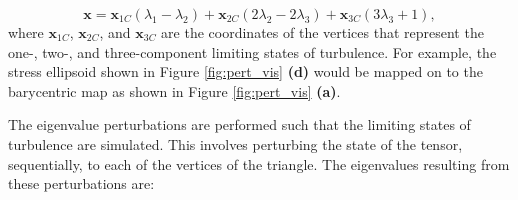 \begin{equation}\label{equ:barycentric_mapping}
    \textbf{x} = \textbf{x}_{1C} (\lambda_1 - \lambda_2) + \textbf{x}_{2C} (2\lambda_2 - 2\lambda_3) + \textbf{x}_{3C} (3\lambda_3 + 1), 
\end{equation}
where $\textbf{x}_{1C}$, $\textbf{x}_{2C}$, and $\textbf{x}_{3C}$ are the coordinates of the vertices that represent the one-, two-, and three-component limiting states of turbulence. For example, the stress ellipsoid shown in Figure \ref{fig:pert_vis} \textbf{(d)} would be mapped on to the barycentric map as shown in Figure \ref{fig:pert_vis} \textbf{(a)}.

The eigenvalue perturbations are performed such that the limiting states of turbulence are simulated. This involves perturbing the state of the tensor, sequentially, to each of the vertices of the triangle. The eigenvalues resulting from these perturbations are: 

